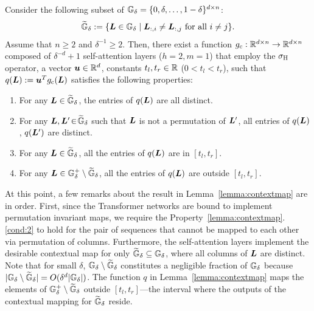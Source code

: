 \begin{lemma}
\label{lemma:contextmap}
Consider the following subset of ${\mathbb{G}}_{\delta} = \{0, \delta, \dots, 1-\delta\}^{d \times n}$:
\begin{equation*}
\widetilde{{\mathbb{G}}}_{\delta}
:= 
\{ {\bm{L}} \in {\mathbb{G}}_{\delta} \mid \text{${\bm{L}}_{:,i} \neq {\bm{L}}_{:,j}$ for all $i \neq j$} \}.
\end{equation*}
Assume that $n \geq 2$ and $\delta^{-1} \geq 2$.
Then, there exist a function $g_{\rm c}: \mathbb{R}^{d \times n} \to \mathbb{R}^{d \times n}$ composed of $\delta^{-d} + 1$ self-attention layers \textup{($h = 2, m = 1$)} that employ the $\sigma_{\rm H}$ operator, a vector ${\bm{u}} \in \mathbb{R}^d$, constants $t_l, t_r \in \mathbb{R}$ \textup{($0 < t_l < t_r$)}, such that $q({\bm{L}}) := {\bm{u}}^T g_{\rm c}({\bm{L}})$ satisfies the following properties:
\begin{enumerate}[\hspace{5pt}1.]
\setlength{\itemsep}{-3pt}
    \item \label{cond:1} For any ${\bm{L}} \in \widetilde{{\mathbb{G}}}_{\delta}$, the entries of $q({\bm{L}})$ are all distinct.
    \item \label{cond:2} For any ${\bm{L}}, {\bm{L}}' \!\in\! \widetilde{{\mathbb{G}}}_{\delta}$ such that ${\bm{L}}$ is not a permutation of ${\bm{L}}'$, all entries of $q({\bm{L}})$, $q({\bm{L}}')$ are distinct.
    \item \label{cond:3} For any ${\bm{L}} \in \widetilde{{\mathbb{G}}}_{\delta}$, all the entries of $q({\bm{L}})$ are in $[t_l, t_r]$.
    \item \label{cond:4} For any ${\bm{L}} \in {\mathbb{G}}^+_{\delta} \setminus \widetilde{{\mathbb{G}}}_{\delta}$, all the entries of $q({\bm{L}})$ are outside $[t_l, t_r]$.
\end{enumerate}
\end{lemma}
At this point, a few remarks about the result in Lemma~\ref{lemma:contextmap} are in order. First, since the Transformer networks are bound to implement permutation invariant maps, we require the Property~\ref{lemma:contextmap}.\ref{cond:2} to hold for the pair of sequences that cannot be mapped to each other via permutation of columns. Furthermore, the self-attention layers implement the desirable contextual map for only $\widetilde{{\mathbb{G}}}_{\delta} \subseteq {\mathbb{G}}_{\delta}$, where all columns of ${\bm{L}}$ are distinct. Note that for small $\delta$, ${\mathbb{G}}_{\delta} \setminus \widetilde{{\mathbb{G}}}_{\delta}$ constitutes a negligible fraction of ${\mathbb{G}}_{\delta}$ because  $|{\mathbb{G}}_{\delta} \setminus \widetilde{{\mathbb{G}}}_{\delta}| = O(\delta^d |{\mathbb{G}}_{\delta}|)$. The function $q$ in Lemma~\ref{lemma:contextmap} maps the elements of ${\mathbb{G}}^+_{\delta} \setminus \widetilde{{\mathbb{G}}}_{\delta}$ outside $[t_l, t_r]$---the interval where the outputs of the contextual mapping for $\widetilde{{\mathbb{G}}}_{\delta}$ reside.

